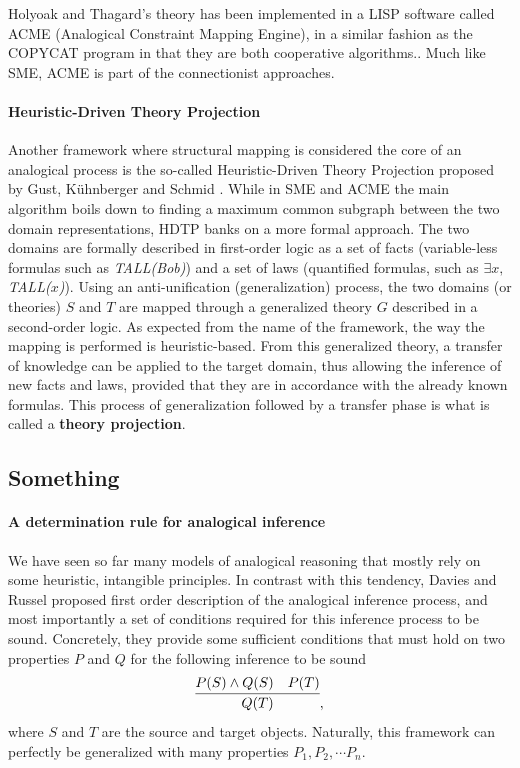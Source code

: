 Holyoak and Thagard's theory has been implemented in a LISP software called
ACME (Analogical Constraint Mapping Engine), in a similar fashion as the
COPYCAT program in that they are both cooperative algorithms.. Much like SME, ACME is part of the connectionist approaches.

\paragraph{Heuristic-Driven Theory Projection\\}

Another framework where structural mapping is considered the core of an
analogical process is the so-called Heuristic-Driven Theory Projection proposed
by Gust, K\"uhnberger and Schmid \cite{GusKunSchTCS06}. While in SME and ACME
the main algorithm boils down to finding a maximum common subgraph between the
two domain representations, HDTP banks on a more formal approach. The two
domains are formally described in first-order logic as a set of facts
(variable-less formulas such as \textit{TALL(Bob)}) and a set of laws
(quantified formulas, such as \textit{$\exists x,$ TALL($x$)}). Using an
anti-unification (generalization) process, the two domains (or theories) $S$
and $T$ are mapped through a generalized theory $G$ described in a second-order
logic. As expected from the name of the framework, the way the mapping is
performed is heuristic-based. From this generalized theory, a transfer of
knowledge can be applied to the target domain, thus allowing the inference of
new facts and laws, provided that they are in accordance with the already known
formulas.  This process of generalization followed by a transfer phase is what
is called a \textbf{theory projection}.

\subsection{Something}

\paragraph{A determination rule for analogical inference\\}

We have seen so far many models of analogical reasoning that mostly rely on
some heuristic, intangible principles. In contrast with this tendency, Davies
and Russel proposed first order description of the analogical inference
process, and most importantly a set of conditions required for this inference
process to be sound.  Concretely, they provide some sufficient conditions that
must hold on two properties $P$ and $Q$ for the
following inference to be sound
$$\infer{Q(T)}{P(S) \wedge Q(S) & P(T)},$$
where $S$ and $T$ are the source and target objects. Naturally, this framework
can perfectly be generalized with many properties $P_1, P_2, \cdots P_n$.

